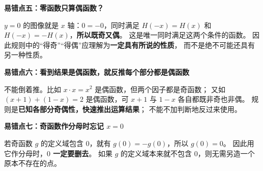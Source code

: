 \clearpage
\begin{trapbox}
\textbf{\textcolor{CTrap}{易错点五：零函数只算偶函数？}}



$y=0$ 的图像就是 $x$ 轴：$0=-0$，同时满足
$H(-x)=H(x)$ 和 $H(-x)=-H(x)$，\textbf{所以既奇又偶}。
这是唯一同时满足这两个条件的函数。
因此规则中的“得奇”“得偶”应理解为\textbf{一定具有所说的性质}，
而不是绝不可能还具有另一种性质。

\medskip

\end{trapbox}
\clearpage
\begin{trapbox}
\textbf{\textcolor{CTrap}{易错点六：看到结果是偶函数，就反推每个部分都是偶函数}}



不能倒着推。比如 $x\cdot x=x^2$ 是偶函数，但两个因子都是奇函数；
又如 $(x+1)+(1-x)=2$ 是偶函数，可 $x+1$ 与 $1-x$ 各自都既非奇也非偶。
规则是\textbf{已知各部分奇偶性，快速推出运算结果}；
不能不加判断地反过来使用。

\medskip

\end{trapbox}
\clearpage
\begin{trapbox}
\textbf{\textcolor{CTrap}{易错点七：奇函数作分母时忘记 $x=0$}}



若奇函数 $g$ 的定义域包含 $0$，就有
$g(0)=-g(0)$，所以 $g(0)=0$。
因此用它作分母时，\textbf{$0$ 一定要删去}。
如果 $g$ 的定义域本来就不包含 $0$，则无需另造一个原本不存在的点。
\end{trapbox}
